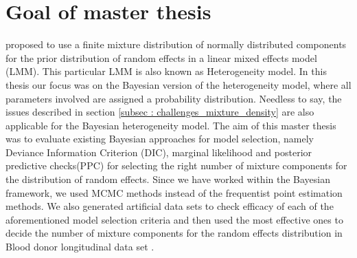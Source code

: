 \section{Goal of master thesis}
\label{sec : goal}
\citet*{verbeke_linear_1996} proposed to use a finite mixture distribution of normally distributed components for the prior distribution of random effects in a linear mixed effects model (LMM). This particular LMM is also known as Heterogeneity model. In this thesis our focus was on the Bayesian version of the heterogeneity model, where all parameters involved are assigned a probability distribution. Needless to say, the issues described in section \ref{subsec : challenges_mixture_density} are also applicable for the Bayesian heterogeneity model. The aim of this master thesis was to evaluate existing Bayesian approaches for model selection, namely Deviance Information Criterion (DIC), marginal likelihood and posterior predictive checks(PPC) for selecting the right number of mixture components for the distribution of random effects. Since we have worked within the Bayesian framework, we used MCMC methods instead of the frequentist point estimation methods. We also generated artificial data sets to check efficacy of each of the aforementioned model selection criteria and then used the most effective ones to decide the number of mixture components for the random effects distribution in Blood donor longitudinal data set \citep{nasserinejad_prevalence_2015}.